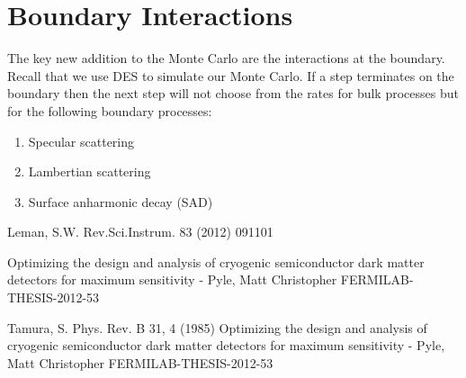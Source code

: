\documentclass[11pt]{article}
\begin{document}
\section*{Boundary Interactions}
The key new addition to the Monte Carlo are the interactions at the boundary. Recall that we use DES to simulate our Monte Carlo. If a step terminates
on the boundary then the next step will not choose from the rates for bulk processes but for the following boundary processes:

\begin{enumerate}
\item Specular scattering
\item Lambertian scattering
\item Surface anharmonic decay (SAD)
\end{enumerate}



\pagebreak
\begin{thebibliography}{99} 
Leman, S.W. Rev.Sci.Instrum. 83 (2012) 091101 

Optimizing the design and analysis of cryogenic semiconductor dark matter detectors for maximum sensitivity - Pyle, Matt Christopher FERMILAB-THESIS-2012-53

Tamura, S. Phys. Rev. B 31, 4 (1985)
Optimizing the design and analysis of cryogenic semiconductor dark matter detectors for maximum sensitivity - Pyle, Matt Christopher FERMILAB-THESIS-2012-53
\end{thebibliography}
\end{document}
